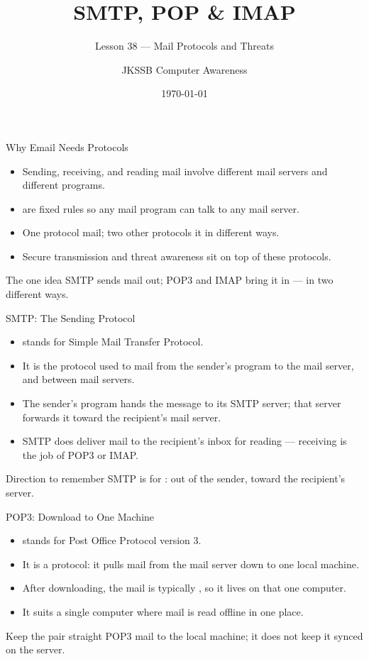 \documentclass[aspectratio=169]{beamer}
\title{SMTP, POP \& IMAP}
\subtitle{Lesson 38 --- Mail Protocols and Threats}
\author{JKSSB Computer Awareness}
\date{\today}
\begin{document}
\frame{\titlepage}

\begin{frame}{Why Email Needs Protocols}
  \begin{itemize}
    \item Sending, receiving, and reading mail involve different mail
      servers and different programs.
    \item {} are fixed rules so any mail program can talk to
      any mail server.
    \item One protocol  mail; two other protocols
       it in different ways.
    \item Secure transmission and threat awareness sit on top of these
      protocols.
  \end{itemize}
  \begin{block}{The one idea}
    SMTP sends mail out; POP3 and IMAP bring it in --- in two different ways.
  \end{block}
\end{frame}

\begin{frame}{SMTP: The Sending Protocol}
  \begin{itemize}
    \item {} stands for Simple Mail Transfer Protocol.
    \item It is the protocol used to  mail from the sender's
      program to the mail server, and between mail servers.
    \item The sender's program hands the message to its SMTP server; that
      server forwards it toward the recipient's mail server.
    \item SMTP does  deliver mail to the recipient's inbox for
      reading --- receiving is the job of POP3 or IMAP.
  \end{itemize}
  \begin{alertblock}{Direction to remember}
    SMTP is for : out of the sender, toward the
    recipient's server.
  \end{alertblock}
\end{frame}

\begin{frame}{POP3: Download to One Machine}
  \begin{itemize}
    \item {} stands for Post Office Protocol version 3.
    \item It is a  protocol: it pulls mail from the mail
      server down to one local machine.
    \item After downloading, the mail is typically , so it lives on that one computer.
    \item It suits a single computer where mail is read offline in one
      place.
  \end{itemize}
  \begin{block}{Keep the pair straight}
    POP3  mail to the local machine; it does not keep it
    synced on the server.
  \end{block}
\end{frame}
\end{document}
